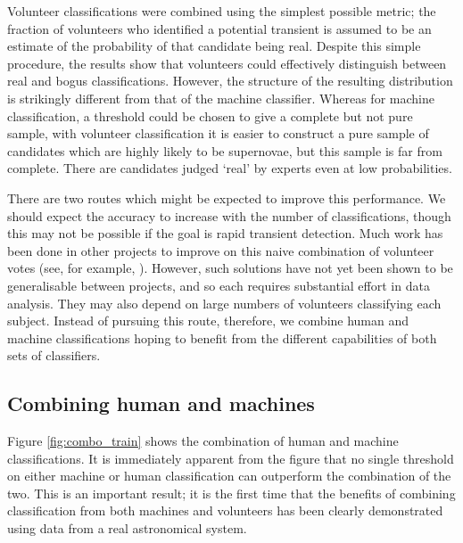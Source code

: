\documentclass[a4paper,fleqn,usenatbib]{mnras}
\begin{document}
Volunteer classifications were combined using the simplest possible metric; the fraction of volunteers who identified a potential transient is assumed to be an estimate of the probability of that candidate being real. Despite this simple procedure, the results show that volunteers could effectively distinguish between real and bogus classifications. However, the structure of the resulting distribution is strikingly different from that of the machine classifier. Whereas for machine classification, a threshold could be chosen to give a complete but not pure sample, with volunteer classification it is easier to construct a pure sample of candidates which are highly likely to be supernovae, but this sample is far from complete. There are candidates judged `real' by experts even at low probabilities. 

There are two routes which might be expected to improve this performance. We should expect the accuracy to increase with the number of classifications, though this may not be possible if the goal is rapid transient detection. Much work has been done in other projects to improve on this naive combination of volunteer votes (see, for example, \citet{Schwamb12, Marshall16}). However, such solutions have not yet been shown to be generalisable between projects, and so each requires substantial effort in data analysis. They may also depend on large numbers of volunteers classifying each subject. Instead of pursuing this route, therefore, we combine human and machine classifications hoping to benefit from the different capabilities of both sets of classifiers. 

\subsection{Combining human and machines} 

Figure \ref{fig:combo_train} shows the combination of human and machine classifications. It is immediately apparent from the figure that no single threshold on either machine or human classification can outperform the combination of the two. This is an important result; it is the first time that the benefits of combining classification from both machines and volunteers has been clearly demonstrated using data from a real astronomical system. 
\end{document}
